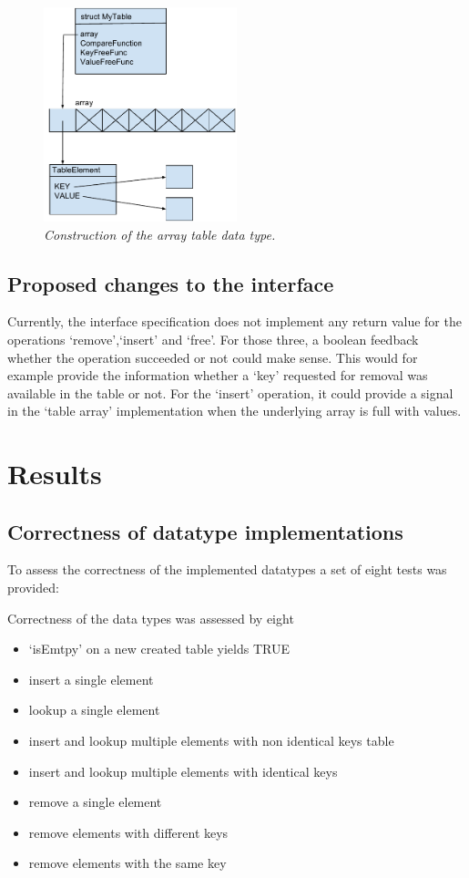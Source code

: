 \documentclass[a4paper,11pt,twoside]{article}
\begin{document}
\begin{figure}[H]
\centering
\includegraphics[width=0.5\textwidth]{figures/arraytable.pdf}
\caption{\textit{Construction of the array table data type.}}
\label{fig:arraytable}
\end{figure}

\subsection{Proposed changes to the interface}
Currently, the interface specification does not implement any 
return value for the operations `remove',`insert' and `free'. For
those three, a boolean feedback whether the operation succeeded or not
could make sense. This would for example provide the information
whether a `key' requested for removal was available in the table or
not. For the `insert' operation, it could provide a signal in the
`table array' implementation when the underlying array is full with
values. 


\section{Results}
\subsection{Correctness of datatype implementations}
To assess the correctness of the implemented datatypes a set of eight
tests was provided:

Correctness of the data types was assessed by eight
\begin{itemize}
\item `isEmtpy' on a new created table yields TRUE
\item insert a single element
\item lookup a single element
\item insert and lookup multiple elements with non identical keys
table
\item insert and lookup multiple elements with identical keys
\item remove a single element
\item remove elements with different keys
\item remove elements with the same key
\end{itemize}
\end{document}
